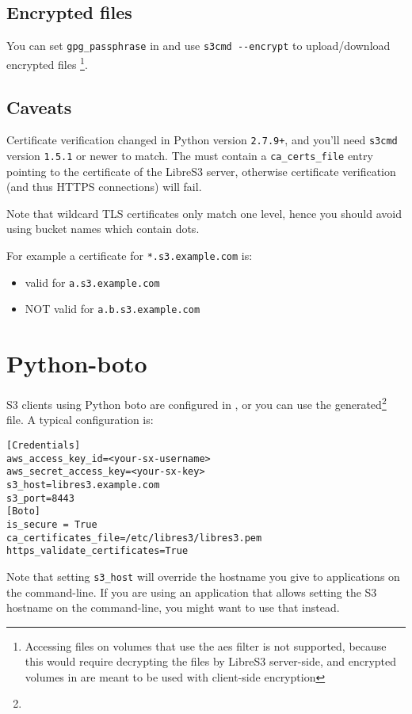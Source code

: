 \subsection{Encrypted files}

You can set \verb|gpg_passphrase| in  and use
\verb|s3cmd --encrypt| to upload/download encrypted files
\footnote{Accessing files on \SX volumes that use the aes filter is not supported, because
this would require decrypting the files by LibreS3 server-side, and encrypted volumes in \SX
are meant to be used with client-side encryption}.

\subsection{Caveats}

Certificate verification changed in Python version \verb|2.7.9+|, and you'll need
\verb|s3cmd| version \verb|1.5.1| or newer to match.
The  must contain a \verb|ca_certs_file| entry pointing to the certificate
of the LibreS3 server, otherwise certificate verification (and thus HTTPS
connections) will fail.

Note that wildcard TLS certificates only match one level, hence you should avoid
using bucket names which contain dots.

For example a certificate for \verb|*.s3.example.com| is:
\begin{itemize}
\item valid for \verb|a.s3.example.com| 
\item NOT valid for \verb|a.b.s3.example.com| 
\end{itemize}

\section{Python-boto}
\label{sec:python-boto}

S3 clients using Python boto are configured in ,
or you can use the generated\footnote{} file.
A typical configuration is:

\begin{lstlisting}
[Credentials]
aws_access_key_id=<your-sx-username>
aws_secret_access_key=<your-sx-key>
s3_host=libres3.example.com
s3_port=8443
[Boto]
is_secure = True
ca_certificates_file=/etc/libres3/libres3.pem
https_validate_certificates=True
\end{lstlisting}

Note that setting \verb|s3_host| will override the hostname you give to
applications on the command-line. If you are using an application that allows
setting the S3 hostname on the command-line, you might want to use that instead.

